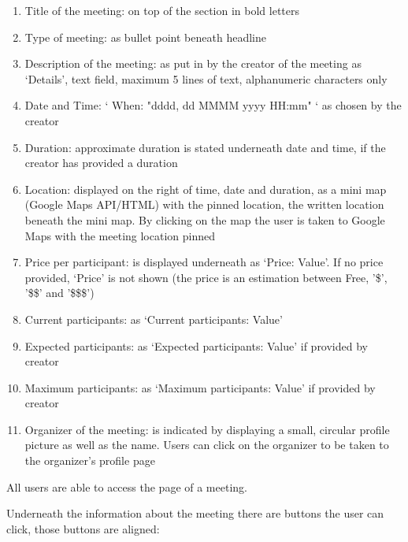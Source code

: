 \documentclass[conference]{IEEEtran}
\begin{document}
\begin{enumerate}
    \item Title of the meeting: on top of the section in bold letters
    \item Type of meeting: as bullet point beneath headline
    \item Description of the meeting: as put in by the creator of the meeting as ‘Details’, text field, maximum 5 lines of text, alphanumeric characters only
    \item Date and Time: ‘ When: "dddd, dd MMMM yyyy HH:mm" ‘ as chosen by the creator
    \item Duration: approximate duration is stated underneath date and time, if the creator has provided a duration
    \item Location: displayed on the right of time, date and duration, as a mini map (Google Maps API/HTML) with the pinned location, the written location beneath the mini map. 
    By clicking on the map the user is taken to Google Maps with the meeting location pinned
    \item Price per participant: is displayed underneath as ‘Price: Value’. If no price provided, ‘Price’ is not shown (the price is an estimation between Free, '\$', '\$\$' and '\$\$\$')
    \item Current participants: as ‘Current participants: Value’
    \item Expected participants: as ‘Expected participants: Value’ if provided by creator
    \item Maximum participants: as ‘Maximum participants: Value’ if provided by creator
    \item Organizer of the meeting: is indicated by displaying a small, circular profile picture as well as the name. 
    Users can click on the organizer to be taken to the organizer's profile page
\end{enumerate}

All users are able to access the page of a meeting.

Underneath the information about the meeting there are buttons the user can click, those buttons are aligned:
\end{document}
